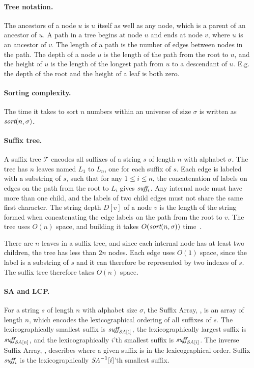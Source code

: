 \documentclass[a4]{article}
\begin{document}
\paragraph{Tree notation.}
The ancestors of a node $u$ is $u$ itself as well as any node, which is a parent of an ancestor of $u$. A path in a tree begins at node $u$ and ends at node $v$, where $u$ is an ancestor of $v$. The length of a path is the number of edges between nodes in the path. The depth of a node $u$ is the length of the path from the root to $u$, and the height of $u$ is the length of the longest path from $u$ to a descendant of $u$. E.g. the depth of the root and the height of a leaf is both zero.

\paragraph{Sorting complexity.} The time it takes to sort $n$ numbers within an universe of size $\sigma$ is written as $\textit{sort}(n,\sigma)$.

\paragraph{Suffix tree.} A suffix tree $\mathcal{T}$ encodes all suffixes of a string $s$ of length $n$ with alphabet $\sigma$. The tree has $n$ leaves named $L_1$ to $L_n$, one for each suffix of $s$. Each edge is labeled with a substring of $s$, such that for any $1\leq i\leq n$, the concatenation of labels on edges on the path from the root to $L_i$ gives $\textit{suff}_i$. Any internal node must have more than one child, and the labels of two child edges must not share the same first character. The string depth $D[v]$ of a node $v$ is the length of the string formed when concatenating the edge labels on the path from the root to $v$.
The tree uses $O(n)$ space, and building it takes $O(\textit{sort}(n,\sigma))$ time~\cite{sort-complexity}.

\ifreport

There are $n$ leaves in a suffix tree, and since each internal node has at least two children, the tree has less than $2n$ nodes. Each edge uses $O(1)$ space, since the label is a substring of $s$ and it can therefore be represented by two indexes of $s$. The suffix tree therefore takes $O(n)$ space.

\fi %

\paragraph{SA and LCP.} For a string $s$ of length $n$ with alphabet size $\sigma$, the Suffix Array, \SA, is an array of length $n$, which encodes the lexicographical ordering of all suffixes of $s$. The lexicographically smallest suffix is $\textit{suff}_{\textit{SA}[1]}$, the lexicographically largest suffix is $\textit{suff}_{\textit{SA}[n]}$, and the lexicographically $i$'th smallest suffix is $\textit{suff}_{\textit{SA}[i]}$. The inverse Suffix Array, \SAi, describes where a given suffix is in the lexicographical order. Suffix $\textit{suff}_i$ is the lexicographically $\textit{SA}^{-1}[i]$'th smallest suffix.
\end{document}
